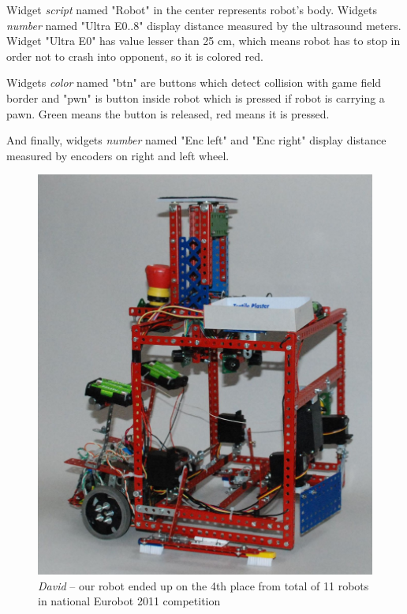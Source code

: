 \documentclass[12pt, a4paper, oneside]{article}
\newcommand{\It}{\textit}  %
\begin{document}
Widget \It{script} named "Robot" in the center represents robot's body. Widgets \It{number} named "Ultra E0..8" display distance measured by the ultrasound meters. Widget "Ultra E0" has value lesser than 25 cm, which means robot has to stop in order not to crash into opponent, so it is colored red.

Widgets \It{color} named "btn" are buttons which detect collision with game field border and "pwn" is button inside robot which is pressed if robot is carrying a pawn. Green means the button is released, red means it is pressed.

And finally, widgets \It{number} named "Enc left" and "Enc right" display distance measured by encoders on right and left wheel.
\begin{figure}[H]
\begin{center}
\includegraphics[scale=0.24]{img/use_david_robot.jpg}
\caption{\It{David} -- our robot ended up on the 4th place from total of 11 robots in national Eurobot 2011 competition}
\end{center}
\end{figure}
\end{document}
